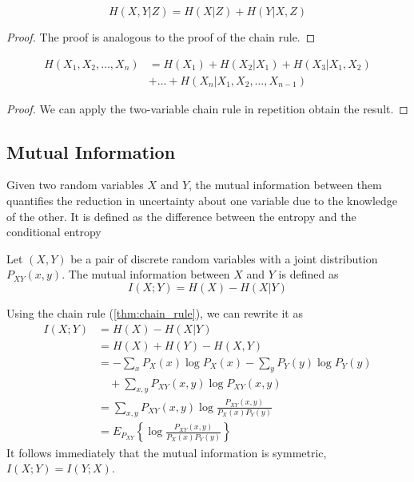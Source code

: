 \begin{corollary}
    \begin{equation}
        H(X, Y|Z) = H(X|Z) + H(Y|X,Z)
    \end{equation}
\end{corollary}
\begin{proof}
    The proof is analogous to the proof of the chain rule.
\end{proof}

\begin{corollary}
    \begin{align}
        H(X_1, X_2, \ldots, X_n) &= H(X_1) + H(X_2|X_1) + H(X_3|X_1, X_2) \nonumber \\
        &+ \ldots + H(X_n|X_1, X_2, \ldots, X_{n-1})
    \end{align}
\end{corollary}
\begin{proof}
    We can apply the two-variable chain rule in repetition obtain the result.
\end{proof}

\subsection{Mutual Information}
Given two random variables $X$ and $Y$, the mutual information between them quantifies the reduction in uncertainty about one variable due to the knowledge of the other. It is defined as the difference between the entropy and the conditional entropy

\begin{definition}\label{def:mutual_information}
    Let $(X,Y)$ be a pair of discrete random variables with a joint distribution $P_{XY}(x,y)$. The mutual information between $X$ and $Y$ is defined as
    \begin{equation}
        I(X;Y) = H(X) - H(X|Y)
    \end{equation}
\end{definition}
\noindent Using the chain rule (\ref{thm:chain_rule}), we can rewrite it as
\begin{align}
    I(X;Y) &= H(X) - H(X|Y) \nonumber \\
    &= H(X) + H(Y) - H(X,Y) \\
    &= -\sum_x P_X(x)\log P_X(x) - \sum_y P_Y(y)\log P_Y(y) \nonumber \\
    & \quad + \sum_{x,y} P_{XY}(x,y)\log P_{XY}(x,y) \\
    &= \sum_{x,y} P_{XY}(x,y)\log \frac{P_{XY}(x,y)}{P_X(x)P_Y(y)} \\
    &= E_{P_{XY}} \left\{ \log \frac{P_{XY}(x,y)}{P_X(x)P_Y(y)} \right\}
\end{align}
It follows immediately that the mutual information is symmetric, $I(X;Y) = I(Y;X)$.

